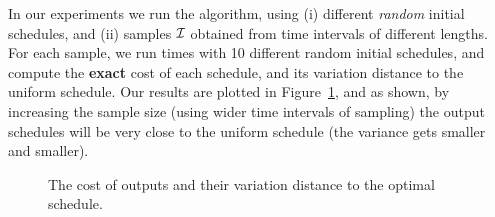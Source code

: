 In our experiments we run the \algonameapx algorithm, using (i) different \emph{random} initial schedules, and (ii) samples $\mathcal{I}$ obtained from time intervals of different lengths. For each sample, we run  times with 10 different random initial schedules, and compute the \textbf{exact} cost of each schedule, and its variation distance to the uniform schedule. Our results are plotted in Figure~\ref{fig:unique}, and as shown, by increasing the sample size (using wider time intervals of sampling) the output schedules will be very close to the uniform schedule (the variance gets smaller and smaller).

\begin{figure}
	\caption{The cost of \algonameapx outputs and their variation distance to the optimal schedule.} \label{fig:unique}
\end{figure}








































